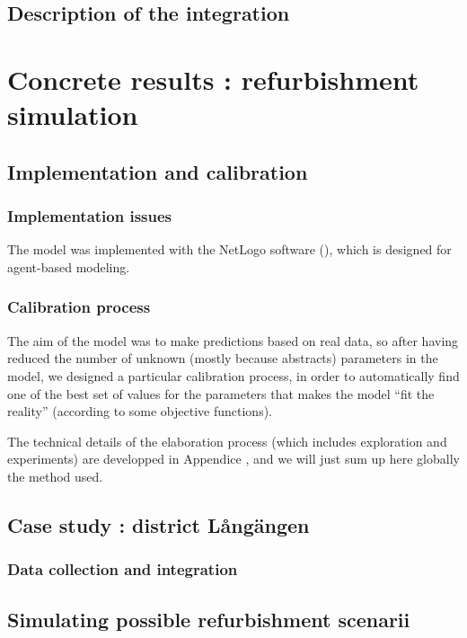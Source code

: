 \documentclass[english]{article}
\begin{document}
\subsection*{Description of the integration}


\section{Concrete results : refurbishment simulation}


\subsection{Implementation and calibration}


\subsubsection{Implementation issues}

The model was implemented with the NetLogo software (\cite{NetLogo}),
which is designed for agent-based modeling.


\subsubsection{Calibration process}

The aim of the model was to make predictions based on real data, so
after having reduced the number of unknown (mostly because abstracts)
parameters in the model, we designed a particular calibration process,
in order to automatically find one of the best set of values for the
parameters that makes the model ``fit the reality'' (according to
some objective functions).

The technical details of the elaboration process (which includes exploration
and experiments) are developped in Appendice , and we will just sum
up here globally the method used.


\subsection{Case study : district L{\aa}ngängen}


\subsubsection{Data collection and integration}


\subsection{Simulating possible refurbishment scenarii}
\end{document}

